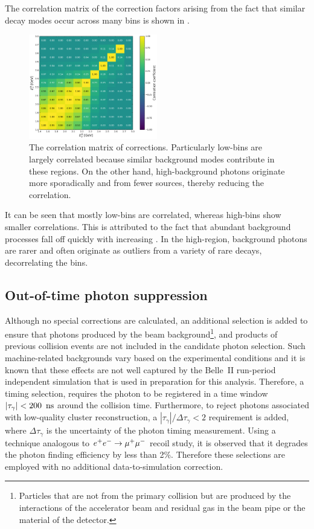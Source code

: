 The correlation matrix of the correction factors arising from the fact that similar decay modes occur across many bins is shown in .
\begin{figure}[htbp!]
    \centering
    \includegraphics[width=0.5\textwidth]{figures/data_sim_corrections/bbar_correlation_matrix.pdf}
    \caption{\label{fig:bbar_correlation_matrix} The correlation matrix of \BB corrections.
    Particularly low-\EB bins are largely correlated because similar background modes contribute in these regions.
    On the other hand, high-\EB background photons originate more sporadically and from fewer sources, thereby reducing the correlation.
    }
\end{figure}
It can be seen that mostly low-\EB bins are correlated, whereas high-\EB bins show smaller correlations.
This is attributed to the fact that abundant background processes fall off quickly with increasing \EB.
In the high-\EB region, background photons are rarer and often originate as outliers from a variety of rare decays, decorrelating the bins.

\subsection{Out-of-time photon suppression}\label{sec:out_of_time_photon_suppression}

Although no special corrections are calculated, an additional selection is added to ensure that photons produced by the beam background\footnote{
Particles that are not from the primary collision but are produced by the interactions of the accelerator beam 
and residual gas in the beam pipe or the material of the detector.},
and products of previous collision events are not included in the candidate photon selection.
Such machine-related backgrounds vary based on the experimental conditions and it is known that these effects are not well captured by the Belle~II run-period independent simulation that is used in preparation for this analysis.
Therefore, a timing selection, requires the photon to be registered in a time window $|\tau_{\gamma}|<200~{\rm \,ns}$ around the collision time.
Furthermore, to reject photons associated with low-quality cluster reconstruction, a $|\tau_{\gamma}|/\Delta\tau_{\gamma}<2$ requirement is added, 
where $\Delta\tau_{\gamma}$ is the uncertainty of the photon timing measurement.
Using a technique analogous to $e^+e^-\rightarrow\mu^+\mu^-$ recoil study, it is observed that it degrades the photon finding efficiency by less than 2\%.
Therefore these selections are employed with no additional data-to-simulation correction.